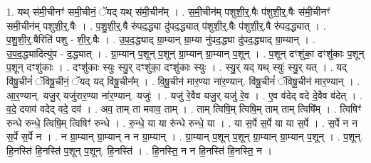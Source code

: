 \documentclass[17pt]{extarticle}
\begin{document}
1. यथ् स॑मी॒चीनꣳ॑ समी॒चीनं॒ ॅयद् यथ् स॑मी॒चीन᳚म् । . स॒मी॒चीन॑म् पशुशी॒र्॒.षैः प॑शुशी॒र्॒.षैः स॑मी॒चीनꣳ॑ समी॒चीन॑म् पशुशी॒र्॒.षैः । . प॒शु॒शी॒र्॒.षै रु॑पद॒द्ध्या दु॑पद॒द्ध्यात् प॑शुशी॒र्॒.षैः प॑शुशी॒र्॒.षै रु॑पद॒द्ध्यात् । . प॒शु॒शी॒र्॒.षैरिति॑ पशु - शी॒र्॒.षैः । . उ॒प॒द॒द्ध्याद् ग्रा॒म्यान् ग्रा॒म्या नु॑पद॒द्ध्या दु॑पद॒द्ध्याद् ग्रा॒म्यान् । . उ॒प॒द॒द्ध्यादित्यु॑प - द॒द्ध्यात् । . ग्रा॒म्यान् प॒शून् प॒शून् ग्रा॒म्यान् ग्रा॒म्यान् प॒शून् । . प॒शून् दꣳशु॑का॒ दꣳशु॑काः प॒शून् प॒शून् दꣳशु॑काः । . दꣳशु॑काः स्युः स्यु॒र् दꣳशु॑का॒ दꣳशु॑काः स्युः । . स्यु॒र् यद् यथ् स्युः॑ स्यु॒र् यत् । . यद् वि॑षू॒चीनं॑ ॅविषू॒चीनं॒ ॅयद् यद् वि॑षू॒चीन᳚म् । . वि॒षू॒चीन॑ मार॒ण्या ना॑र॒ण्यान्. वि॑षू॒चीनं॑ ॅविषू॒चीन॑ मार॒ण्यान् । . आ॒र॒ण्यान्. यजु॒र् यजु॑रार॒ण्या ना॑र॒ण्यान्. यजुः॑ । . यजु॑ रे॒वैव यजु॒र् यजु॑ रे॒व । . ए॒व व॑देद् वदे दे॒वैव व॑देत् । . व॒दे॒ दवाव॑ वदेद् वदे॒ दव॑ । . अव॒ ताम् ता मवाव॒ ताम् । . ताम् त्विषि॒म् त्विषि॒म् ताम् ताम् त्विषि᳚म् । . त्विषिꣳ॑ रुन्धे रुन्धे॒ त्विषि॒म् त्विषिꣳ॑ रुन्धे । . रु॒न्धे॒ या या रु॑न्धे रुन्धे॒ या । . या स॒र्पे स॒र्पे या या स॒र्पे । . स॒र्पे न न स॒र्पे स॒र्पे न । . न ग्रा॒म्यान् ग्रा॒म्यान् न न ग्रा॒म्यान् । . ग्रा॒म्यान् प॒शून् प॒शून् ग्रा॒म्यान् ग्रा॒म्यान् प॒शून् । . प॒शून्. हि॒नस्ति॑ हि॒नस्ति॑ प॒शून् प॒शून्. हि॒नस्ति॑ । . हि॒नस्ति॒ न न हि॒नस्ति॑ हि॒नस्ति॒ न । \newline
\end{document}
